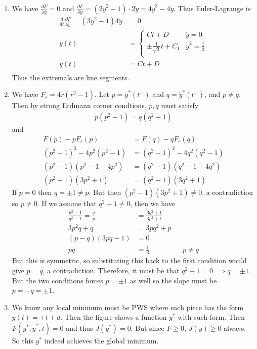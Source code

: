 \documentclass[12pt]{article}
\begin{document}
\begin{problem}[7]
\begin{enumerate}[label=(\roman*)]
	\item We have $ \frac{\partial F}{\partial y} =0$ and $ \frac{\partial F}{\partial \dot{y}} = (2\dot{y}^2-1) \cdot 2\dot{y} = 4\dot{y}^3-4\dot{y}$. Thus Euler-Lagrange is
	\begin{align*}
		\frac{d}{dt} \frac{\partial F}{\partial \dot{y}} = (3\dot{y}^2 -1)4 \ddot{y} &= 0 \\
		y(t)&= \begin{cases}
			Ct+D & \ddot{y}=0\\
			\pm \frac{1}{\sqrt{3} }t+C_1 & \dot{y}^2 = \frac{1}{3}\\
		\end{cases}\\
		y(t)&= Ct+D \\
	\end{align*}
Thus the extremals are line segments.
\item We have $ F_r = 4r(r^2-1)$. Let $ p=\dot{y}^* (t^{-})$ and $ q = \dot{y}^* (t^{+})$, and $ p \neq q$. Then by strong Erdmann corner condtions, $ p,q$ must satisfy
	 \begin{align*}
		 p(p^2-1) =q(q^2-1)
	\end{align*}
	and
	\begin{align*}
		F(p)-p F_r(p) &= F(q)-qF_r(q) \\
		(p^2-1)^2 - 4p^2(p^2-1) &= (q^2-1)^2 - 4q^2(q^2-1) \\
		(p^2-1)(p^2-1-4p^2) &= (q^2-1)(q^2-1-4q^2) \\
		(p^2-1)(3p^2+1) &= (q^2-1)(3q^2+1) 
	\end{align*}
	If $ p=0$ then  $ q = \pm 1 \neq p$. But then  $ (p^2-1)(3p^2+1) \neq 0$, a contradiction so $ p \neq 0$. If we assume that $ q^2-1 \neq 0$, then we have
	\begin{align*}
		\frac{p^2-1}{ q^2-1} = \frac{q}{p} &= \frac{3q^2+1}{ 3p^2+1}  \\
		3p^2q + q &= 3pq^2+p \\
		(p-q)(3pq-1) &= 0 \\
		pq &= \frac{1}{3} && p \neq q
	\end{align*}
	But this is symmetric, so substituting this back to the first condition would give $ p=q$, a contradiction. Therefore, it must be that  $ q^2-1 = 0 \implies q = \pm 1$. But the two conditions forces $ p = \pm 1$ as well so the slope must be $ p = -q = \pm 1$. 
\item We know any local minimum must be PWS where each piece has the form $ y(t) = \pm t +d$. Then the figure shows a function $ y^* $ with such form. Then $ F(y^* ,\dot{y}^* ,t) = 0$ and thus $ J(y^* ) = 0$. But since $ F \geq 0$,  $ J(y) \geq 0$ always. So this  $ y^* $ indeed achieves the global minimum.

\end{enumerate}
\end{problem}
\end{document}

